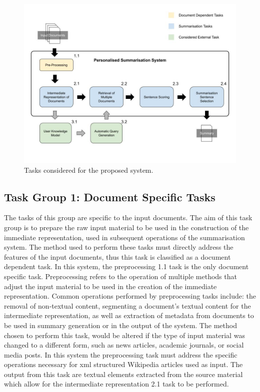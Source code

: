 \begin{figure}[h]
    \centering
         \includegraphics[width=1.0\textwidth]{Figures/Task_of_FYP_system.jpg}
          \caption{Tasks considered for the proposed system.}
           \label{tasks}
\end{figure}

\subsection{Task Group 1: Document Specific Tasks}
The tasks of this group are specific to the input documents. The aim of this task group is to prepare the raw input material to be used in the construction of the immediate representation, used in subsequent operations of the summarisation system. The method used to perform these tasks must directly address the features of the input documents, thus this task is classified as a document dependent task. In this system, the preprocessing 1.1 task is the only document specific task. Preprocessing refers to the operation of multiple methods that adjust the input material to be used in the creation of the immediate representation. Common operations performed by preprocessing tasks include: the removal of non-textual content, segmenting a document's textual content for the intermediate representation, as well as extraction of metadata from documents to be used in summary generation or in the output of the system. The method chosen to perform this task, would be altered if the type of input material was changed to a different form, such as news articles, academic journals, or social media posts. In this system the preprocessing task must address the specific operations necessary for xml structured Wikipedia articles used as input. The output from this task are textual elements extracted from the source material which allow for the intermediate representation 2.1 task to be performed.

